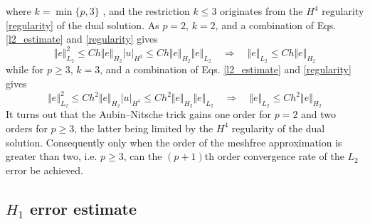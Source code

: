where $k=\min\{p,3\}$ \cite{}, and the restriction $k\le3$ originates from the $H^{4}$ regularity \eqref{regularity} of the dual solution.
As $p=2$, $k=2$, and a combination of Eqs. \eqref{l2_estimate} and \eqref{regularity} gives
\begin{equation}\label{l2_p2_abs}
	\Vert e \Vert_{L_2}^2\le C h\Vert e \Vert_{H_2}\vert u \vert_{H^{3}}\le C h\Vert e \Vert_{H_2}\Vert e \Vert_{L_2}
	\quad
	\Rightarrow
	\quad
	\Vert e \Vert_{L_2}\le C h\Vert e \Vert_{H_{2}}
\end{equation}
while for $p\ge3$, $k=3$, and a combination of Eqs. \eqref{l2_estimate} and \eqref{regularity} gives
\begin{equation}\label{l2_p3_abs}
	\Vert e \Vert_{L_2}^2\le C h^{2}\Vert e \Vert_{H_2}\vert u \vert_{H^{4}}\le C h^{2}\Vert e \Vert_{H_2}\Vert e \Vert_{L_2}
	\quad\Rightarrow\quad
	\Vert e \Vert_{L_2}\le C h^{2}\Vert e \Vert_{H_2}
\end{equation}
It turns out that the Aubin--Nitsche trick gains one order for $p=2$ and two orders for $p\ge3$, the latter being limited by the $H^{4}$ regularity of the dual solution.
Consequently only when the order of the meshfree approximation is greater than two, i.e. $p\ge3$, can the $(p+1)$th order convergence rate of the $L_2$ error be achieved.

\subsection{$H_1$ error estimate}\label{sec:h1}

